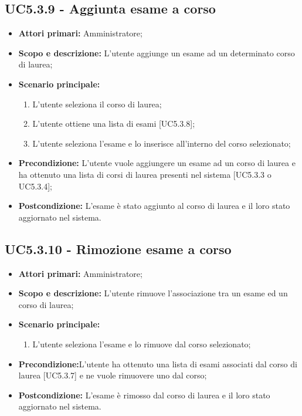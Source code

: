 \documentclass[AnalisiDeiRequisiti.tex]{subfiles}
\begin{document}
\subsection{UC5.3.9 - Aggiunta esame a corso}
\begin{itemize}
	\item \textbf{Attori primari:} Amministratore;
	\item \textbf{Scopo e descrizione:} L'utente aggiunge un esame ad un determinato corso di laurea;
	\item \textbf{Scenario principale:}
		\begin{enumerate}
			\item L'utente seleziona il corso di laurea;
			\item L'utente ottiene una lista di esami [UC5.3.8];
			\item L'utente seleziona l'esame e lo inserisce all'interno del corso selezionato;
		\end{enumerate}
	\item \textbf{Precondizione:} L'utente vuole aggiungere un esame ad un corso di laurea e ha ottenuto una lista di corsi di laurea presenti nel sistema [UC5.3.3 o UC5.3.4]; 
	\item \textbf{Postcondizione:} L'esame è stato aggiunto al corso di laurea e il loro stato aggiornato nel sistema.
\end{itemize}
\subsection{UC5.3.10 - Rimozione esame a corso}
\begin{itemize}
	\item \textbf{Attori primari:} Amministratore;
	\item \textbf{Scopo e descrizione:} L'utente rimuove l'associazione tra un esame ed un corso di laurea;
	\item \textbf{Scenario principale:}
	\begin{enumerate}
		\item L'utente seleziona l'esame e lo rimuove dal corso selezionato;
	\end{enumerate}
	\item \textbf{Precondizione:}L'utente ha ottenuto una lista di esami associati dal corso di laurea [UC5.3.7] e ne vuole rimuovere uno dal corso; 
	\item \textbf{Postcondizione:} L'esame è rimosso dal corso di laurea e il loro stato aggiornato nel sistema.
\end{itemize}
\end{document}
